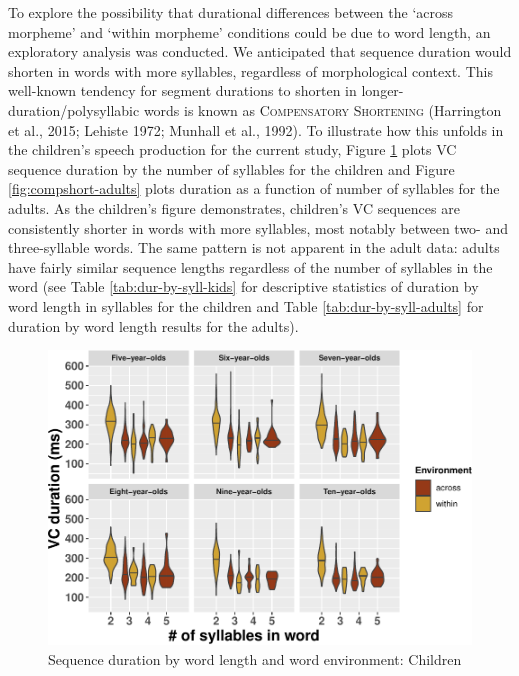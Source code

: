 \documentclass[
]{article}
\begin{document}
To explore the possibility that durational differences between the `across morpheme' and `within morpheme' conditions could be due to word length, an exploratory analysis was conducted. We anticipated that sequence duration would shorten in words with more syllables, regardless of morphological context. This well-known tendency for segment durations to shorten in longer-duration/polysyllabic words is known as \textsc{Compensatory Shortening} (Harrington et al., 2015; Lehiste 1972; Munhall et al., 1992). To illustrate how this unfolds in the children's speech production for the current study, Figure \ref{fig:compshort-kids} plots VC sequence duration by the number of syllables for the children and Figure \ref{fig:compshort-adults} plots duration as a function of number of syllables for the adults. As the children's figure demonstrates, children's VC sequences are consistently shorter in words with more syllables, most notably between two- and three-syllable words. The same pattern is not apparent in the adult data: adults have fairly similar sequence lengths regardless of the number of syllables in the word (see Table \ref{tab:dur-by-syll-kids} for descriptive statistics of duration by word length in syllables for the children and Table \ref{tab:dur-by-syll-adults} for duration by word length results for the adults).

\begin{figure}
\centering
\includegraphics{3_ch3_results_files/figure-latex/compshort-kids-1.pdf}
\caption{\label{fig:compshort-kids}Sequence duration by word length and word environment: Children}
\end{figure}
\end{document}
